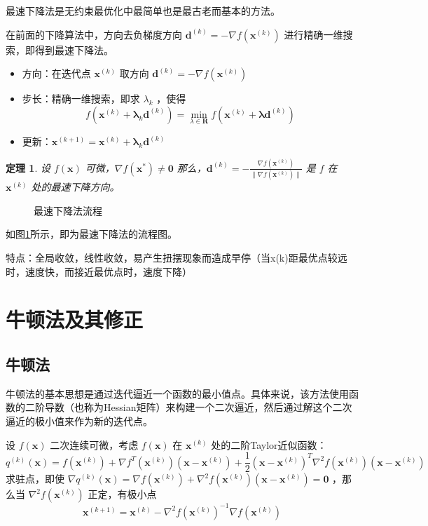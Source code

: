 \documentclass{book}
\newtheorem{theorem}{定理}[chapter]
\begin{document}
最速下降法是无约束最优化中最简单也是最古老而基本的方法。

在前面的下降算法中，方向去负梯度方向 $\boldsymbol{d}^{(k)}=-\nabla f(\boldsymbol{x}^{(k)})$ 进行精确一维搜索，即得到最速下降法。

\begin{itemize}
    \item 方向：在迭代点 $\boldsymbol{x}^{(k)}$ 取方向 $\boldsymbol{d}^{(k)}=-\nabla f(\boldsymbol{x}^{(k)})$
    \item 步长：精确一维搜索，即求 $\lambda_k$ ，使得
          $$f(\boldsymbol{x}^{(k)}+\boldsymbol{\lambda}_k\boldsymbol{d}^{(k)})=\min_{\lambda\in\mathbf{R}}f(\boldsymbol{x}^{(k)}+\boldsymbol{\lambda}\boldsymbol{d}^{(k)})$$
    \item 更新：$\boldsymbol{x}^{(k+1)}=\boldsymbol{x}^{(k)}+\boldsymbol{\lambda}_k\boldsymbol{d}^{(k)}$
\end{itemize}

\begin{theorem}
    设 $f(\boldsymbol{x})$ 可微，$\nabla f(\boldsymbol{x}^*)\ne\boldsymbol{0}$ 那么，$\boldsymbol{d}^{(k)}=-\frac{\nabla f(\boldsymbol{x}^{(k)})}{\|\nabla f(\boldsymbol{x}^{(k)})\|}$ 是 $f$ 在 $\boldsymbol{x}^{(k)}$ 处的最速下降方向。
\end{theorem}

\begin{figure}[ht]
    \centering
    
    \caption{最速下降法流程}
    \label{fig:flow of steepest descent method}
\end{figure}

如图\ref{fig:flow of steepest descent method}所示，即为最速下降法的流程图。

特点：全局收敛，线性收敛，易产生扭摆现象而造成早停（当x(k)距最优点较远时，速度快，而接近最优点时，速度下降）

\section{牛顿法及其修正}

\subsection{牛顿法}

牛顿法的基本思想是通过迭代逼近一个函数的最小值点。具体来说，该方法使用函数的二阶导数（也称为Hessian矩阵）来构建一个二次逼近，然后通过解这个二次逼近的极小值来作为新的迭代点。

设 $f(\boldsymbol{x})$ 二次连续可微，考虑 $f(\boldsymbol{x})$ 在 $\boldsymbol{x}^{(k)}$ 处的二阶Taylor近似函数：
$$
    q^{(k)}(\boldsymbol{x})=f(\boldsymbol{x}^{(k)})+\nabla f^T(\boldsymbol{x}^{(k)})(\boldsymbol{x}-\boldsymbol{x}^{(k)})+\frac{1}{2}(\boldsymbol{x}-\boldsymbol{x}^{(k)})^T\nabla^2f(\boldsymbol{x}^{(k)})(\boldsymbol{x}-\boldsymbol{x}^{(k)})
$$
求驻点，即使 $\nabla q^{(k)}(\boldsymbol{x})=\nabla f(\boldsymbol{x}^{(k)})+\nabla^2f(\boldsymbol{x}^{(k)})(\boldsymbol{x}-\boldsymbol{x}^{(k)})=\boldsymbol{0}$ ，那么当 $\nabla^2f(\boldsymbol{x}^{(k)})$ 正定，有极小点
$$
    \boldsymbol{x}^{(k+1)}=\boldsymbol{x}^{(k)}-\nabla^2f(\boldsymbol{x}^{(k)})^{-1}\nabla f(\boldsymbol{x}^{(k)})
$$
\end{document}
